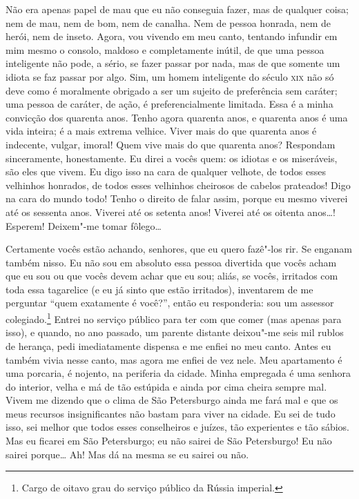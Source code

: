 Não era apenas papel de mau que eu não conseguia fazer, mas de qualquer
coisa; nem de mau, nem de bom, nem de canalha. Nem de pessoa honrada,
nem de herói, nem de inseto. Agora, vou vivendo em meu canto, tentando
infundir em mim mesmo o consolo, maldoso e completamente inútil, de que
uma pessoa inteligente não pode, a sério, se fazer passar por nada, mas
de que somente um idiota se faz passar por algo. Sim, um homem
inteligente do século \textsc{xix} não só deve como é moralmente obrigado a ser
um sujeito de preferência sem caráter; uma pessoa de caráter, de ação,
é preferencialmente limitada. Essa é a minha convicção dos quarenta
anos. Tenho agora quarenta anos, e quarenta anos é uma vida inteira; é
a mais extrema velhice. Viver mais do que quarenta anos é indecente,
vulgar, imoral! Quem vive mais do que quarenta anos? Respondam
sinceramente, honestamente. Eu direi a vocês quem: os idiotas e os
miseráveis, são eles que vivem. Eu digo isso na cara de qualquer
velhote, de todos esses velhinhos honrados, de todos esses velhinhos
cheirosos de cabelos prateados! Digo na cara do mundo todo! Tenho o
direito de falar assim, porque eu mesmo viverei até os sessenta anos.
Viverei até os setenta anos! Viverei até os oitenta anos\ldots{}! Esperem!
Deixem"-me tomar fôlego\ldots{}

Certamente vocês estão achando, senhores, que eu quero fazê"-los rir. Se
enganam também nisso. Eu não sou em absoluto essa pessoa divertida que
vocês acham que eu sou ou que vocês devem achar que eu sou; aliás, se
vocês, irritados com toda essa tagarelice (e eu já sinto que estão
irritados), inventarem de me perguntar “quem exatamente é você?”, então
eu responderia: sou um assessor colegiado.\footnote{ Cargo de oitavo
grau do serviço público da Rússia imperial.} Entrei no serviço público
para ter com que comer (mas apenas para isso), e quando, no ano
passado, um parente distante deixou"-me seis mil rublos de herança, pedi
imediatamente dispensa e me enfiei no meu canto. Antes eu também vivia
nesse canto, mas agora me enfiei de vez nele. Meu apartamento é uma
porcaria, é nojento, na periferia da cidade. Minha empregada é uma
senhora do interior, velha e má de tão estúpida e ainda por cima cheira
sempre mal. Vivem me dizendo que o clima de São Petersburgo ainda me
fará mal e que os meus recursos insignificantes não bastam para viver
na cidade. Eu sei de tudo isso, sei melhor que todos esses conselheiros
e juízes, tão experientes e tão sábios. Mas eu ficarei em São
Petersburgo; eu não sairei de São Petersburgo! Eu não sairei porque\ldots{}
Ah! Mas dá na mesma se eu sairei ou não.

